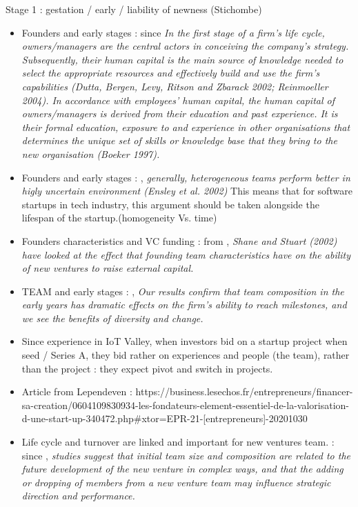 \begin{itemize}
\begin{itemize}
Stage 1 : gestation / early / liability of newness (Stichombe)\\
\begin{itemize}
  \item Founders and early stages : since \citep{de2010interrelationships}  \textit{In the first stage of a firm’s life cycle, owners/managers are the central actors in conceiving the company’s strategy. Subsequently, their human capital is the main source of knowledge needed to select the appropriate resources and effectively build and use the firm’s capabilities (Dutta, Bergen, Levy, Ritson and Zbarack 2002; Reinmoeller 2004). In accordance with employees’ human capital, the human capital of owners/managers is derived from their education and past experience. It is their formal education, exposure to and experience in other organisations that determines the unique set of skills or knowledge base that they bring to the new organisation (Boeker 1997).}
  \item Founders and early stages : \citep{steffens2012birds}, \textit{generally, heterogeneous teams perform better in higly uncertain environment (Ensley et al. 2002)} This means that for software startups in tech industry, this argument should be taken alongside the lifespan of the startup.(homogeneity Vs. time)
  \item Founders characteristics and VC funding : from \citep{delmar2006does}, \textit{ Shane and Stuart (2002) have looked at the effect that founding team characteristics have on the ability of new ventures to raise external capital.}
  \item TEAM and early stages : \cite{beckman2007early}, \textit{Our results confirm that team composition in the early years has dramatic effects on the firm’s ability to reach milestones, and we see the benefits of diversity and change.}
  \item Since experience in IoT Valley, when investors bid on a startup project when seed / Series A, they bid rather on experiences and people (the team), rather than the project :  they expect pivot and switch in projects.
  \item Article from Lependeven : https://business.lesechos.fr/entrepreneurs/financer-sa-creation/0604109830934-les-fondateurs-element-essentiel-de-la-valorisation-d-une-start-up-340472.php#xtor=EPR-21-[entrepreneurs]-20201030
  \item Life cycle and turnover are linked and important for new ventures team. : since \citet{chandler2005antecedents}, \textit{studies suggest that initial team size and composition are related to the future development of the new venture in complex ways, and that the adding or dropping of members from a new venture team may influence strategic direction and performance.}

\end{itemize}
\end{itemize}
\end{itemize}

